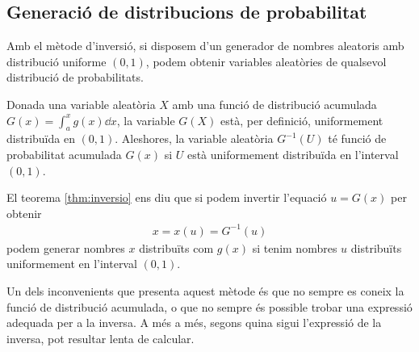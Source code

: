 \subsection{Generació de distribucions de probabilitat}
Amb el mètode d'inversió, si disposem d'un generador de nombres aleatoris amb distribució uniforme $(0,1)$, podem obtenir variables aleatòries de qualsevol distribució de probabilitats.

\begin{thm}\label{thm:inversio}
	Donada una variable aleatòria $X$ amb una funció de distribució acumulada $G(x) = \int_{a}^{x} g(x) \dd{x}$, la variable $G(X)$ està, per definició, uniformement distribuïda en $(0,1)$. Aleshores, la variable aleatòria $G^{-1}(U)$ té funció de probabilitat acumulada $G(x)$ si $U$ està uniformement distribuïda en l'interval $(0,1)$.
\end{thm}

\begin{meth}[d'inversió]\label{meth:inversio}
	El teorema \ref{thm:inversio} ens diu que si podem invertir l'equació $u = G(x)$ per obtenir
	\begin{align}
		x = x(u) = G^{-1}(u)
	\end{align}
	podem generar nombres $x$ distribuïts com $g(x)$ si tenim nombres $u$ distribuïts uniformement en l'interval $(0,1)$.
\end{meth}

Un dels inconvenients que presenta aquest mètode és que no sempre es coneix la funció de distribució acumulada, o que no sempre és possible trobar una expressió adequada per a la inversa. A més a més, segons quina sigui l'expressió de la inversa, pot resultar lenta de calcular.

